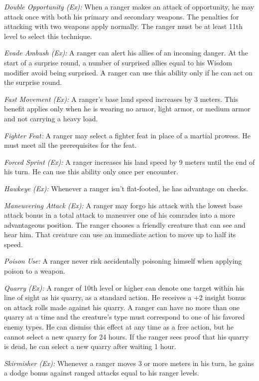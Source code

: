 \textit{Double Opportunity (Ex):} When a ranger makes an attack of opportunity, he may attack once with both his primary and secondary weapons. The penalties for attacking with two weapons apply normally. The ranger must be at least 11th level to select this technique.

\textit{Evade Ambush (Ex):} A ranger can alert his allies of an incoming danger. At the start of a surprise round, a number of surprised allies equal to his Wisdom modifier avoid being surprised. A ranger can use this ability only if he can act on the surprise round.

\textit{Fast Movement (Ex):} A ranger's base land speed increases by 3 meters. This benefit applies only when he is wearing no armor, light armor, or medium armor and not carrying a heavy load.

\textit{Fighter Feat:} A ranger may select a fighter feat in place of a martial prowess. He must meet all the prerequisites for the feat.

\textit{Forced Sprint (Ex):} A ranger increases his land speed by 9 meters until the end of his turn. He can use this ability only once per encounter.

\textit{Hawkeye (Ex):} Whenever a ranger isn't flat-footed, he has advantage on  checks.

\textit{Maneuvering Attack (Ex):} A ranger may forgo his attack with the lowest base attack bonus in a total attack to maneuver one of his comrades into a more advantageous position. The ranger chooses a friendly creature that can see and hear him. That creature can use an immediate action to move up to half its speed.

\textit{Poison Use:} A ranger never risk accidentally poisoning himself when applying poison to a weapon.

\textit{Quarry (Ex):} A ranger of 10th level or higher can denote one target within his line of sight as his quarry, as a standard action. He receives a +2 insight bonus on attack rolls made against his quarry. A ranger can have no more than one quarry at a time and the creature's type must correspond to one of his favored enemy types. He can dismiss this effect at any time as a free action, but he cannot select a new quarry for 24 hours. If the ranger sees proof that his quarry is dead, he can select a new quarry after waiting 1 hour.

\textit{Skirmisher (Ex):} Whenever a ranger moves 3 or more meters in his turn, he gains a dodge bonus against ranged attacks equal to \onequarter his ranger levels.


